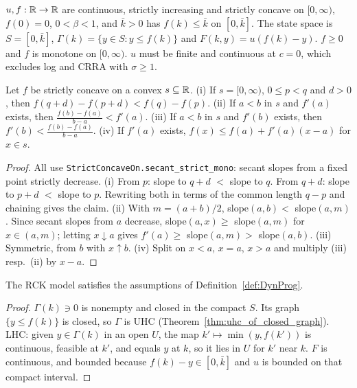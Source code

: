 \begin{definition}
\label{def:rck}
\leanok
$u, f : \mathbb{R} \to \mathbb{R}$ are continuous, strictly increasing and strictly concave on $[0, \infty)$, $f(0) = 0$,
$0 < \beta < 1$, and $\bar k > 0$ has $f(k) \le \bar k$ on $[0, \bar k]$. The state space is $S = [0, \bar k]$,
$\Gamma(k) = \{y \in S : y \le f(k)\}$ and $F(k, y) = u(f(k) - y)$. $f \ge 0$ and $f$ is monotone on $[0, \infty)$.
$u$ must be finite and continuous at $c = 0$, which excludes log and CRRA with $\sigma \ge 1$.
\end{definition}

\begin{lemma}
\label{lem:strictConcave_calculus}
\leanok
Let $f$ be strictly concave on a convex $s \subseteq \mathbb{R}$.
(i) If $s = [0, \infty)$, $0 \le p < q$ and $d > 0$, then $f(q + d) - f(p + d) < f(q) - f(p)$.
(ii) If $a < b$ in $s$ and $f'(a)$ exists, then $\frac{f(b) - f(a)}{b - a} < f'(a)$.
(iii) If $a < b$ in $s$ and $f'(b)$ exists, then $f'(b) < \frac{f(b) - f(a)}{b - a}$.
(iv) If $f'(a)$ exists, $f(x) \le f(a) + f'(a)(x - a)$ for $x \in s$.
\end{lemma}
\begin{proof}
\leanok
All use \texttt{StrictConcaveOn.secant\_strict\_mono}: secant slopes from a fixed point strictly decrease. (i) From $p$:
slope to $q + d$ $<$ slope to $q$. From $q + d$: slope to $p + d$ $<$ slope to $p$. Rewriting both in terms of the
common length $q - p$ and chaining gives the claim. (ii) With $m = (a + b)/2$, slope$(a, b) <$ slope$(a, m)$. Since secant slopes
from $a$ decrease, slope$(a, x) \ge$ slope$(a, m)$ for $x \in (a, m)$; letting $x \downarrow a$ gives
$f'(a) \ge$ slope$(a, m) >$ slope$(a, b)$.
(iii) Symmetric, from $b$ with $x \uparrow b$. (iv) Split on $x < a$, $x = a$, $x > a$ and multiply (iii) resp.\ (ii) by
$x - a$.
\end{proof}

\begin{theorem}
\label{thm:rck_dynprog}
\leanok
{}
The RCK model satisfies the assumptions of Definition~\ref{def:DynProg}.
\end{theorem}
\begin{proof}
\leanok
$\Gamma(k) \ni 0$ is nonempty and closed in the compact $S$. Its graph $\{y \le f(k)\}$ is closed, so $\Gamma$ is UHC
(Theorem~\ref{thm:uhc_of_closed_graph}). LHC: given $y \in \Gamma(k)$ in an open $U$, the map
$k' \mapsto \min(y, f(k'))$ is continuous, feasible at $k'$, and equals $y$ at $k$, so it lies in $U$ for $k'$ near $k$.
$F$ is continuous, and bounded because $f(k) - y \in [0, \bar k]$ and $u$ is bounded on that compact interval.
\end{proof}

